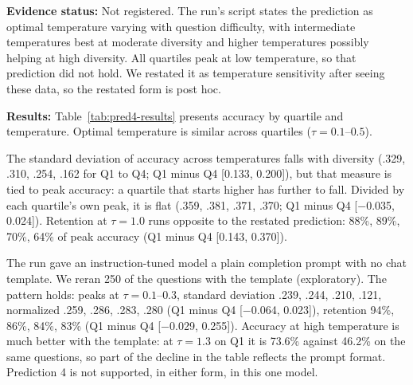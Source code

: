 \textbf{Evidence status:} Not registered. The run's script states the prediction as optimal temperature varying with question difficulty, with intermediate temperatures best at moderate diversity and higher temperatures possibly helping at high diversity. All quartiles peak at low temperature, so that prediction did not hold. We restated it as temperature sensitivity after seeing these data, so the restated form is post hoc.

\textbf{Results:} Table~\ref{tab:pred4-results} presents accuracy by quartile and temperature. Optimal temperature is similar across quartiles ($\tau = 0.1$--$0.5$).



The standard deviation of accuracy across temperatures falls with diversity (.329, .310, .254, .162 for Q1 to Q4; Q1 minus Q4 [0.133, 0.200]), but that measure is tied to peak accuracy: a quartile that starts higher has further to fall. Divided by each quartile's own peak, it is flat (.359, .381, .371, .370; Q1 minus Q4 [$-$0.035, 0.024]). Retention at $\tau=1.0$ runs opposite to the restated prediction: 88\%, 89\%, 70\%, 64\% of peak accuracy (Q1 minus Q4 [0.143, 0.370]).

The run gave an instruction-tuned model a plain completion prompt with no chat template. We reran 250 of the questions with the template (exploratory). The pattern holds: peaks at $\tau = 0.1$--$0.3$, standard deviation .239, .244, .210, .121, normalized .259, .286, .283, .280 (Q1 minus Q4 [$-$0.064, 0.023]), retention 94\%, 86\%, 84\%, 83\% (Q1 minus Q4 [$-$0.029, 0.255]). Accuracy at high temperature is much better with the template: at $\tau=1.3$ on Q1 it is 73.6\% against 46.2\% on the same questions, so part of the decline in the table reflects the prompt format. Prediction 4 is not supported, in either form, in this one model.
